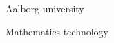 \begin{titlepage}
	\cite{frontpic}
	
	\vspace{0.5\baselineskip} %
	
	
	
	\vfill %
	
	
	
	
	\vspace{0.3\baselineskip} %
	
	\large Aalborg university %
	
	{\large Mathematics-technology} %

\end{titlepage}
